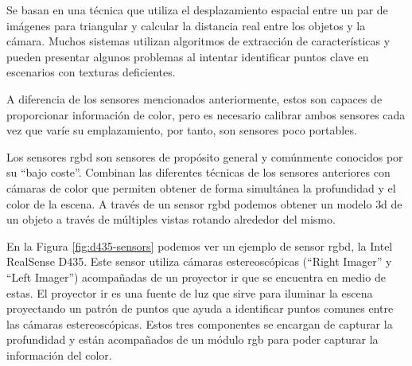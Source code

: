 \begin{description}
    Se basan en una técnica que utiliza el desplazamiento espacial entre un par de imágenes para triangular y calcular la distancia real entre los objetos y la cámara.
    Muchos sistemas utilizan algoritmos de extracción de características y pueden presentar algunos problemas al intentar identificar puntos clave en escenarios con texturas deficientes.

    A diferencia de los sensores mencionados anteriormente, estos son capaces de proporcionar información de color, pero es necesario calibrar ambos sensores cada vez que varíe su emplazamiento, por tanto, son sensores poco portables.

\end{description}

Los sensores \gls{rgbd} son sensores de propósito general y comúnmente conocidos por su ``bajo coste''.
Combinan las diferentes técnicas de los sensores anteriores con cámaras de color que permiten obtener de forma simultánea la profundidad y el color de la escena.
A través de un sensor \gls{rgbd} podemos obtener un modelo \gls{3d} de un objeto a través de múltiples vistas rotando alrededor del mismo.

En la Figura \ref{fig:d435-sensors} podemos ver un ejemplo de sensor \gls{rgbd}, la Intel RealSense D435.
Este sensor utiliza cámaras estereoscópicas (``Right Imager'' y ``Left Imager'') acompañadas de un proyector \gls{ir} que se encuentra en medio de estas.
El proyector \gls{ir} es una fuente de luz que sirve para iluminar la escena proyectando un patrón de puntos que ayuda a identificar puntos comunes entre las cámaras estereoscópicas.
Estos tres componentes se encargan de capturar la profundidad y están acompañados de un módulo \gls{rgb} para poder capturar la información del color.

